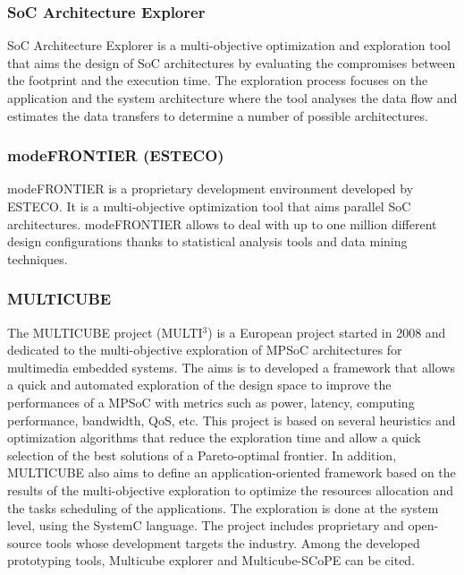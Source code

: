 \subsubsection{SoC Architecture Explorer}

SoC Architecture Explorer \cite{ueda05architecture} is a multi-objective optimization and exploration tool that aims the design of SoC architectures by evaluating the compromises between the footprint and the execution time. The exploration process focuses on the application and the system architecture where the tool analyses the data flow and estimates the data transfers to determine a number of possible architectures.

\subsubsection{modeFRONTIER (ESTECO)}

modeFRONTIER \cite{esteco01} is a proprietary development environment developed by ESTECO. It is a multi-objective optimization tool that aims parallel SoC architectures. modeFRONTIER allows to deal with up to one million different design configurations thanks to statistical analysis tools and data mining techniques.

\subsubsection{MULTICUBE}

The MULTICUBE project (MULTI$^{3}$) \cite{multicube08, Silvanoetal09} is a European project started in 2008 and dedicated to the multi-objective exploration of MPSoC architectures for multimedia embedded systems. The aims is to developed a framework that allows a quick and automated exploration of the design space to improve the performances of a MPSoC with metrics such as power, latency, computing performance, bandwidth, QoS, etc. This project is based on several heuristics and optimization algorithms that reduce the exploration time and allow a quick selection of the best solutions of a Pareto-optimal frontier. In addition, MULTICUBE also aims to define an application-oriented framework based on the results of the multi-objective exploration to optimize the resources allocation and the tasks scheduling of the applications. The exploration is done at the system level, using the SystemC language. The project includes proprietary and open-source tools whose development targets the industry. Among the developed prototyping tools, Multicube explorer and Multicube-SCoPE can be cited.

